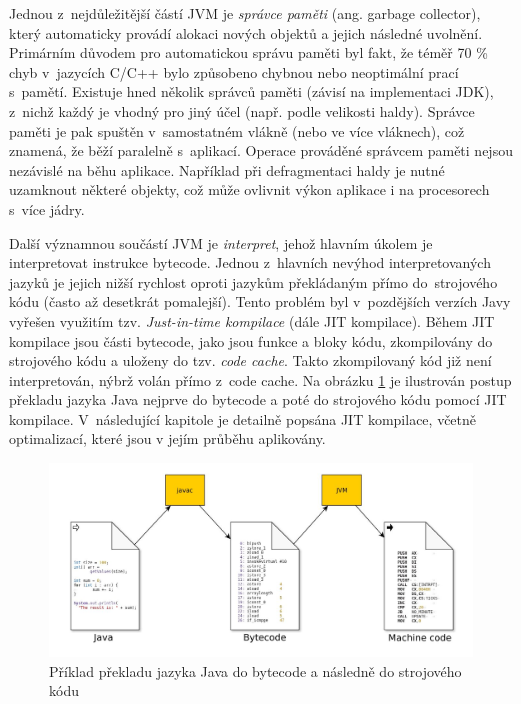 \documentclass[
  master,
  biblatex,
  figures=true,
  theorems,
  sourcecodes,
  glossaries,
  index
]{kidiplom}
\begin{document}
Jednou z~nejdůležitější částí JVM je \textit{správce paměti} (ang. garbage collector), který automaticky provádí alokaci nových objektů a jejich následné uvolnění. Primárním důvodem pro automatickou správu paměti byl fakt, že téměř 70 \% chyb v~jazycích C/C++ bylo způsobeno chybnou nebo neoptimální prací s~pamětí. Existuje hned několik správců paměti (závisí na implementaci JDK), z~nichž každý je vhodný pro jiný účel (např. podle velikosti haldy). Správce paměti je pak spuštěn v~samostatném vlákně (nebo ve více vláknech), což znamená, že běží paralelně s~aplikací. Operace prováděné správcem paměti nejsou nezávislé na běhu aplikace. Například při defragmentaci haldy je nutné uzamknout některé objekty, což může ovlivnit výkon aplikace i na procesorech s~více jádry. \cite{spravce-pameti} 


Další významnou součástí JVM je \textit{interpret}, jehož hlavním úkolem je interpretovat instrukce bytecode. Jednou z~hlavních nevýhod interpretovaných jazyků je jejich nižší rychlost oproti jazykům překládaným přímo do~strojového kódu (často až desetkrát pomalejší). Tento problém byl v~pozdějších verzích Javy vyřešen využitím tzv. \textit{Just-in-time kompilace} (dále JIT kompilace). Během JIT kompilace jsou části bytecode, jako jsou funkce a bloky kódu, zkompilovány do strojového kódu a uloženy do tzv. \textit{code cache}. Takto zkompilovaný kód již není interpretován, nýbrž volán přímo z~code cache. Na obrázku \ref{fig:jit-compilation scheme} je ilustrován postup překladu jazyka Java nejprve do bytecode a poté do strojového kódu pomocí JIT kompilace. V~následující kapitole je detailně popsána JIT kompilace, včetně optimalizací, které jsou v jejím průběhu aplikovány. 


\begin{figure} [h]
    \centering
    \includegraphics[width= 1\textwidth]{images/JIT-compilation scheme.jpeg}
    \caption{Příklad překladu jazyka Java do bytecode a následně do strojového kódu \cite{jit-compilation}}
    \label{fig:jit-compilation scheme}
\end{figure}
\end{document}
